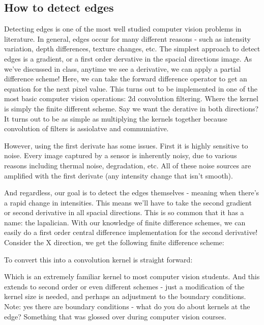 \documentclass{article}
\begin{document}
\subsection*{How to detect edges}
Detecting edges is one of the most well studied computer vision problems in literature. In general, edges occur for many different reasons - such as intensity variation, depth differences, texture changes, etc. The simplest approach to detect edges is a gradient, or a first order dervative in the spacial directions image. As we've discussed in class, anytime we see a derivative, we can apply a partial difference scheme! Here, we can take the forward difference operator to get an equation for the next pixel value. This turns out to be implemented in one of the most basic computer vision operations: 2d convolution filtering. Where the kernel is simply the finite different scheme. Say we want the derative in both directions? It turns out to be as simple as multiplying the kernels together because convolution of filters is assiolatve and communiative. 

However, using the first derivate has some issues. First it is highly sensitive to noise. Every image captured by a sensor is inherently noisy, due to various reasons including thermal noise, degradation, etc. All of these noise sources are amplified with the first derivate (any intensity change that isn't smooth).

And regardless, our goal is to detect the edges themselves - meaning when there's a rapid change in intensities. This means we'll have to take the second gradient or second derivative in all spacial directions. This is so common that it has a name: the lapalician. With our knowledge of finite difference schemes, we can easily do a first order central difference implementation for the second derivative! Consider the X direction, we get the following finite difference scheme:

To convert this into a convolution kernel is straight forward:

Which is an extremely familiar kernel to most computer vision students. And this extends to second order or even different schemes - just a modification of the kernel size is needed, and perhaps an adjustment to the boundary conditions. Note: yes there are boundary conditions - what do you do about kernels at the edge? Something that was glossed over during computer vision courses.
\end{document}
